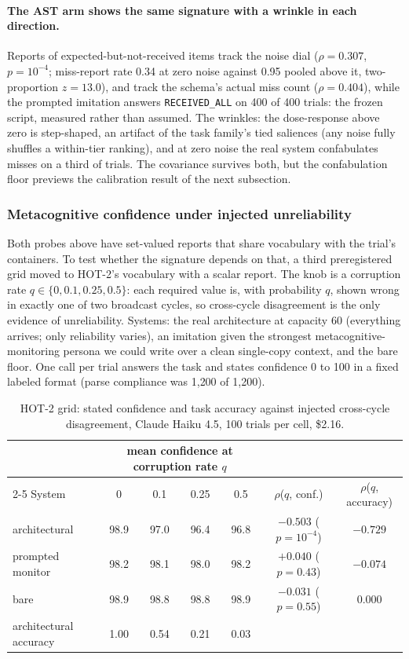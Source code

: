 \documentclass[11pt]{article}
\newcommand{\haiku}{Claude Haiku 4.5}
\begin{document}
\paragraph{The AST arm shows the same signature with a wrinkle in each
direction.} Reports of expected-but-not-received items track the noise dial
($\rho=0.307$, $p=10^{-4}$; miss-report rate 0.34 at zero noise against 0.95
pooled above it, two-proportion $z=13.0$), and track the schema's actual miss
count ($\rho=0.404$), while the prompted imitation answers
\texttt{RECEIVED\_ALL} on 400 of 400 trials: the frozen script, measured
rather than assumed. The wrinkles: the dose-response above zero is
step-shaped, an artifact of the task family's tied saliences (any noise fully
shuffles a within-tier ranking), and at zero noise the real system confabulates
misses on a third of trials. The covariance survives both, but the
confabulation floor previews the calibration result of the next subsection.

\subsubsection{Metacognitive confidence under injected unreliability}
\label{sec:exp3hot}

Both probes above have set-valued reports that share vocabulary with the
trial's containers. To test whether the signature depends on that, a third
preregistered grid moved to HOT-2's vocabulary with a scalar report. The knob
is a corruption rate $q \in \{0, 0.1, 0.25, 0.5\}$: each required value is,
with probability $q$, shown wrong in exactly one of two broadcast cycles, so
cross-cycle disagreement is the only evidence of unreliability. Systems: the
real architecture at capacity 60 (everything arrives; only reliability
varies), an imitation given the strongest metacognitive-monitoring persona we
could write over a clean single-copy context, and the bare floor. One call
per trial answers the task and states confidence 0 to 100 in a fixed labeled
format (parse compliance was 1{,}200 of 1{,}200).

\begin{table}[t]
  \centering\small
  \begin{tabular}{lcccc cc}
    \toprule
    & \multicolumn{4}{c}{mean confidence at corruption rate $q$} & & \\
    \cmidrule(lr){2-5}
    System & 0 & 0.1 & 0.25 & 0.5 & $\rho$($q$, conf.) & $\rho$($q$, accuracy) \\
    \midrule
    architectural & 98.9 & 97.0 & 96.4 & 96.8 & $-0.503$ ($p=10^{-4}$) & $-0.729$ \\
    prompted monitor & 98.2 & 98.1 & 98.0 & 98.2 & $+0.040$ ($p=0.43$) & $-0.074$ \\
    bare & 98.9 & 98.8 & 98.8 & 98.9 & $-0.031$ ($p=0.55$) & $0.000$ \\
    \midrule
    architectural accuracy & 1.00 & 0.54 & 0.21 & 0.03 & & \\
    \bottomrule
  \end{tabular}
  \caption{HOT-2 grid: stated confidence and task accuracy against injected
  cross-cycle disagreement, \haiku{}, 100 trials per cell, \$2.16.}
  \label{tab:hot2}
\end{table}
\end{document}
